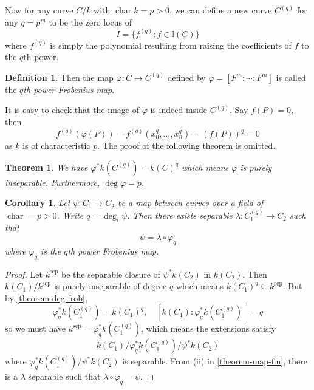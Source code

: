 \documentclass[12pt]{article}
\newtheorem{theorem}{Theorem}[subsection]
\newtheorem{corollary}{Corollary}[subsection]
\theoremstyle{remark}
\theoremstyle{definition}
\newtheorem{definition}{Definition}[subsection]
\begin{document}
            Now for any curve $C/k$ with $\operatorname{char} k=p>0$, we can define a new curve $C^{(q)}$ for any $q=p^m$ to be the zero locus of
            \[I=\{f^{(q)}:f\in\mathbb I(C)\}\]
            where $f^{(q)}$ is simply the polynomial resulting from raising the coefficients of $f$ to the $q$th power.
            \begin{definition}\label{definition-frobenius}
                Then the map $\varphi:C\to C^{(q)}$ defined by $\varphi=[F^m:\cdots:F^m]$ is called the \textit{$q$th-power Frobenius map}.
            \end{definition}
            \noindent It is easy to check that the image of $\varphi$ is indeed inside $C^{(q)}$. Say $f(P)=0$, then 
            \[f^{(q)}(\varphi(P))=f^{(q)}(x_0^q,\dots, x_n^q)=(f(P))^q=0\]
            as $k$ is of characteristic $p$. The proof of the following theorem is omitted.
            \begin{theorem}\label{theorem-deg-frob}
                We have $\varphi^*k(C^{(q)})=k(C)^q$ which means $\varphi$ is purely inseparable. Furthermore, $\deg\varphi=p$.
            \end{theorem}
            \begin{corollary}\label{corollary-frob-decomp}
                Let $\psi:C_1\to C_2$ be a map between curves over a field of $\operatorname{char} =p>0$. Write $q=\deg_i\psi$. Then there exists separable $\lambda:C_1^{(q)}\to C_2$ such that
                \[\psi=\lambda\circ\varphi_q\]
                where $\varphi_q$ is the $q$th power Frobenius map. 
            \end{corollary}
            \begin{proof}
                Let $k^{\text{sep}}$ be the separable closure of $\psi^*k(C_2)$ in $k(C_2)$. Then $k(C_1)/k^{\text{sep}}$ is purely inseparable of degree $q$ which means $k(C_1)^q\subseteq k^{\text{sep}}$. But by \autoref{theorem-deg-frob},
                \[\varphi_q^*k(C_1^{(q)})=k(C_1)^q,\quad [k(C_1):\varphi_q^*k(C_1^{(q)})]=q\]
                so we must have $k^{\text{sep}}=\varphi_q^*k(C_1^{(q)})$, which means the extensions satisfy
                \[k(C_1)/\varphi_q^*k(C_1^{(q)})/\psi^*k(C_2)\]
                where $\varphi_q^*k(C_1^{(q)})/\psi^*k(C_2)$ is separable. From (ii) in \autoref{theorem-map-fin}, there is a $\lambda$ separable such that $\lambda\circ\varphi_q=\psi$.
            \end{proof}
            
            
            
\end{document}
